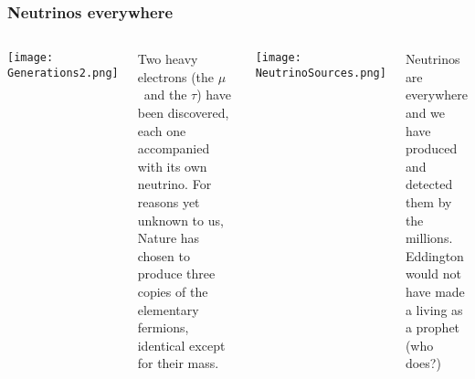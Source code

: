 %
%
%
%
%
%
%
%
%
%
\begin{frame}
\frametitle{Neutrinos everywhere}
\begin{columns}
\texttt{[image: Generations2.png]}

Two heavy electrons (the $\mu$~and the $\tau$) have been discovered, each one accompanied with its own neutrino. For reasons yet unknown to us, Nature has chosen to produce three copies of the elementary fermions, identical except for their mass. 
 
\texttt{[image: NeutrinoSources.png]}

Neutrinos are everywhere and we have produced and detected them by the millions. Eddington would not have made a living as a prophet (who does?)


\end{columns}




\end{frame}

